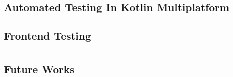 \documentclass[12pt,a4paper,openright,twoside]{book}
\begin{document}
\section{Automated Testing In Kotlin Multiplatform}
\label{sec:automated-testing-in-kotlin-multiplatform}
\section{Frontend Testing}
\label{sec:frontend-testing}
\chapter{\conclusionsname}
\label{chap:conclusions}
\section{Future Works}
\label{sec:future-works}
\nocite{*}


\end{document}
